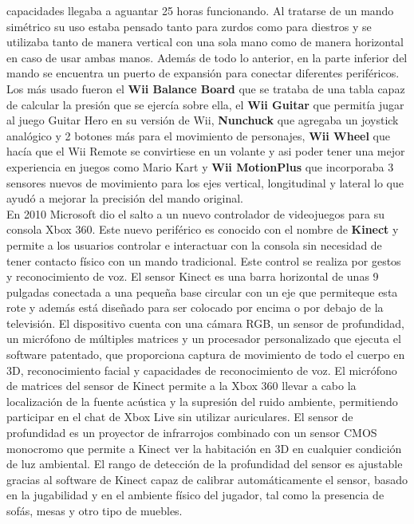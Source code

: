 capacidades llegaba a aguantar 25 horas funcionando. Al tratarse de un mando sim\'etrico su uso estaba pensado tanto para zurdos como para diestros y se utilizaba tanto de manera vertical con una sola mano como de manera horizontal en caso de usar ambas manos. Adem\'as de todo lo anterior, en la parte inferior del mando se encuentra un puerto de expansi\'on para conectar diferentes perif\'ericos. Los m\'as usado fueron el \textbf{Wii Balance Board} que se trataba de una tabla capaz de calcular la presi\'on que se ejerc\'ia sobre ella, el \textbf{Wii Guitar} que permit\'ia jugar al juego Guitar Hero en su versi\'on de Wii, \textbf{Nunchuck} que agregaba un joystick anal\'ogico y 2 botones m\'as para el movimiento de personajes, \textbf{Wii Wheel} que hac\'ia que el Wii Remote se convirtiese en un volante y asi poder tener una mejor experiencia en juegos como Mario Kart y \textbf{Wii MotionPlus} que incorporaba 3 sensores nuevos de movimiento para los ejes vertical, longitudinal y lateral lo que ayud\'o a mejorar la precisi\'on del mando original.\\

En 2010 Microsoft dio el salto a un nuevo controlador de videojuegos para su consola Xbox 360. Este nuevo perif\'erico es conocido con el nombre de \textbf{Kinect} y permite a los usuarios controlar e interactuar con la consola sin necesidad de tener contacto f\'isico con un mando tradicional. Este control se realiza por gestos y reconocimiento de voz. El sensor Kinect es una barra horizontal de unas 9 pulgadas conectada a una peque\~na base circular con un eje que permiteque esta rote y adem\'as est\'a dise\~nado para ser colocado por encima o por debajo de la televisi\'on. El dispositivo cuenta con una c\'amara RGB, un sensor de profundidad, un micr\'ofono de m\'ultiples matrices y un procesador personalizado que ejecuta el software patentado, que proporciona captura de movimiento de todo el cuerpo en 3D, reconocimiento facial y capacidades de reconocimiento de voz. El micr\'ofono de matrices del sensor de Kinect permite a la Xbox 360 llevar a cabo la localizaci\'on de la fuente ac\'ustica y la supresi\'on del ruido ambiente, permitiendo participar en el chat de Xbox Live sin utilizar auriculares. El sensor de profundidad es un proyector de infrarrojos combinado con un sensor CMOS monocromo que permite a Kinect ver la habitaci\'on en 3D en cualquier condici\'on de luz ambiental. El rango de detecci\'on de la profundidad del sensor es ajustable gracias al software de Kinect capaz de calibrar autom\'aticamente el sensor, basado en la jugabilidad y en el ambiente f\'isico del jugador, tal como la presencia de sof\'as, mesas y otro tipo de muebles.\\

